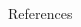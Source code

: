 \documentclass[final]{beamer}
\begin{document}
\begin{frame}{}
\begin{columns}[t]
\begin{column}{.3\linewidth}
\begin{block}{References}
\end{block}

\end{column}

  

\end{columns}
\end{frame}
\end{document}
